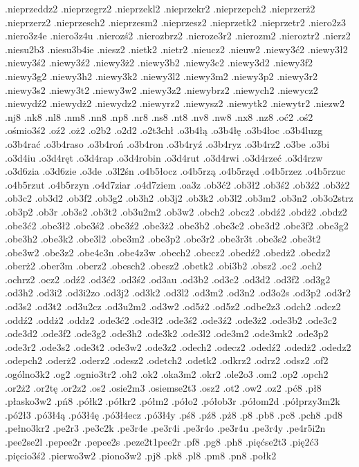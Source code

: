 {.nieprzeddz2
.nieprzegrz2
.nieprzekl2
.nieprzekr2
.nieprzepch2
.nieprzerż2
.nieprzerz2
.nieprzesch2
.nieprzesm2
.nieprzesz2
.nieprzetk2
.nieprzetr2
.niero2z3
.niero3z4e
.niero3z4u
.nierozś2
.nierozbrz2
.nieroze3r2
.nierozm2
.nieroztr2
.nierz2
.niesu2b3
.niesu3b4ie
.niesz2
.nietk2
.nietr2
.nieucz2
.nieuw2
.niewy3ć2
.niewy3ł2
.niewy3ś2
.niewy3ź2
.niewy3ż2
.niewy3b2
.niewy3c2
.niewy3d2
.niewy3f2
.niewy3g2
.niewy3h2
.niewy3k2
.niewy3l2
.niewy3m2
.niewy3p2
.niewy3r2
.niewy3s2
.niewy3t2
.niewy3w2
.niewy3z2
.niewybrz2
.niewych2
.niewycz2
.niewydź2
.niewydż2
.niewydz2
.niewyrz2
.niewysz2
.niewytk2
.niewytr2
.niezw2
.nj8
.nk8
.nl8
.nm8
.nn8
.np8
.nr8
.ns8
.nt8
.nv8
.nw8
.nx8
.nz8
.oć2
.oś2
.ośmio3ś2
.oź2
.oż2
.o2b2
.o2d2
.o2t3chł
.o3b4łą
.o3b4łę
.o3b4łoc
.o3b4luzg
.o3b4rać
.o3b4raso
.o3b4roń
.o3b4ron
.o3b4ryź
.o3b4ryz
.o3b4rz2
.o3be
.o3bi
.o3d4iu
.o3d4ręt
.o3d4rap
.o3d4robin
.o3d4rut
.o3d4rwi
.o3d4rzeć
.o3d4rzw
.o3d6zia
.o3d6zie
.o3de
.o3l2śn
.o4b5łocz
.o4b5rzą
.o4b5rzęd
.o4b5rzez
.o4b5rzuc
.o4b5rzut
.o4b5rzyn
.o4d7ziar
.o4d7ziem
.oa3z
.ob3ć2
.ob3ł2
.ob3ś2
.ob3ź2
.ob3ż2
.ob3c2
.ob3d2
.ob3f2
.ob3g2
.ob3h2
.ob3j2
.ob3k2
.ob3l2
.ob3m2
.ob3n2
.ob3o2strz
.ob3p2
.ob3r
.ob3s2
.ob3t2
.ob3u2m2
.ob3w2
.obch2
.obcz2
.obdź2
.obdż2
.obdz2
.obe3ć2
.obe3ł2
.obe3ś2
.obe3ź2
.obe3ż2
.obe3b2
.obe3c2
.obe3d2
.obe3f2
.obe3g2
.obe3h2
.obe3k2
.obe3l2
.obe3m2
.obe3p2
.obe3r2
.obe3r3t
.obe3s2
.obe3t2
.obe3w2
.obe3z2
.obe4c3n
.obe4z3w
.obech2
.obecz2
.obedź2
.obedż2
.obedz2
.oberż2
.ober3m
.oberz2
.obesch2
.obesz2
.obetk2
.obi3b2
.obsz2
.oc2
.och2
.ochrz2
.ocz2
.odź2
.od3ć2
.od3ś2
.od3au
.od3b2
.od3c2
.od3d2
.od3f2
.od3g2
.od3h2
.od3i2
.od3i2zo
.od3j2
.od3k2
.od3l2
.od3m2
.od3n2
.od3o2s
.od3p2
.od3r2
.od3s2
.od3t2
.od3u2cz
.od3u2m2
.od3w2
.od5ż2
.od5z2
.odbe2z3
.odch2
.odcz2
.oddź2
.oddż2
.oddz2
.ode3ć2
.ode3ł2
.ode3ś2
.ode3ź2
.ode3ż2
.ode3b2
.ode3c2
.ode3d2
.ode3f2
.ode3g2
.ode3h2
.ode3k2
.ode3l2
.ode3m2
.ode3mk2
.ode3p2
.ode3r2
.ode3s2
.ode3t2
.ode3w2
.ode3z2
.odech2
.odecz2
.odedź2
.odedż2
.odedz2
.odepch2
.oderż2
.oderz2
.odesz2
.odetch2
.odetk2
.odkrz2
.odrz2
.odsz2
.of2
.ogólno3k2
.og2
.ognio3tr2
.oh2
.ok2
.oka3m2
.okr2
.ole2o3
.om2
.op2
.opch2
.or2ż2
.or2tę
.or2z2
.os2
.osie2m3
.osiemse2t3
.osz2
.ot2
.ow2
.oz2
.pć8
.pł8
.płasko3w2
.pń8
.półk2
.półkr2
.półm2
.póło2
.półob3r
.półom2d
.półprzy3m2k
.pó2ł3
.pó3ł4ą
.pó3ł4ę
.pó3ł4ecz
.pó3ł4y
.pś8
.pź8
.pż8
.p8
.pb8
.pc8
.pch8
.pd8
.pełno3kr2
.pe2r3
.pe3c2k
.pe3r4e
.pe3r4i
.pe3r4o
.pe3r4u
.pe3r4y
.pe4r5i2n
.pee2se2l
.pepee2r
.pepee2s
.peze2t1pee2r
.pf8
.pg8
.ph8
.pięćse2t3
.pię2ć3
.pięcio3ś2
.pierwo3w2
.piono3w2
.pj8
.pk8
.pl8
.pm8
.pn8
.połk2
}
